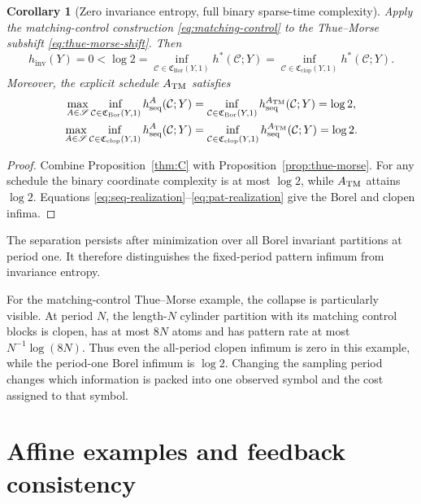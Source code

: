 \documentclass[11pt,reqno]{amsart}
\numberwithin{equation}{section}
\newtheorem{corollary}[theorem]{Corollary}
\theoremstyle{definition}
\theoremstyle{definition}
\newcommand{\C}{\mathcal C}
\newcommand{\hseq}{h_{\mathrm{seq}}}
\newcommand{\hpat}{h^{*}}
\newcommand{\hinv}{h_{\mathrm{inv}}}
\newcommand{\Bor}{\mathrm{Bor}}
\newcommand{\clop}{\mathrm{clop}}
\begin{document}
\begin{corollary}[Zero invariance entropy, full binary sparse-time complexity]
\label{cor:separation}
Apply the matching-control construction \eqref{eq:matching-control} to the
Thue--Morse subshift \eqref{eq:thue-morse-shift}.  Then
\begin{equation}\label{eq:strict-control-separation}
 \hinv(Y)=0
 <\log2
 =\inf_{\C\in\mathfrak C_{\Bor}(Y,1)}\hpat(\C;Y)
 =\inf_{\C\in\mathfrak C_{\clop}(Y,1)}\hpat(\C;Y).
\end{equation}
Moreover, the explicit schedule $A_{\rm TM}$ satisfies
\begin{align}
 \max_{A\in\mathscr S}\inf_{\C\in\mathfrak C_{\Bor}(Y,1)}
 \hseq^A(\C;Y)
 &=\inf_{\C\in\mathfrak C_{\Bor}(Y,1)}\hseq^{A_{\rm TM}}(\C;Y)
 =\log2,
 \label{eq:TM-Borel-sequence}\\
 \max_{A\in\mathscr S}\inf_{\C\in\mathfrak C_{\clop}(Y,1)}
 \hseq^A(\C;Y)
 &=\inf_{\C\in\mathfrak C_{\clop}(Y,1)}\hseq^{A_{\rm TM}}(\C;Y)
 =\log2.
 \label{eq:TM-clopen-sequence}
\end{align}
\end{corollary}

\begin{proof}
Combine Proposition~\ref{thm:C} with Proposition~\ref{prop:thue-morse}.  For any
schedule the binary coordinate complexity is at most $\log2$, while
$A_{\rm TM}$ attains $\log2$.  Equations
\eqref{eq:seq-realization}--\eqref{eq:pat-realization} give the Borel and
clopen infima.
\end{proof}

The separation persists after minimization over all Borel invariant
partitions at period one. It therefore distinguishes the fixed-period
pattern infimum from invariance entropy.


For the matching-control Thue--Morse example, the collapse is particularly
visible. At period $N$, the length-$N$ cylinder partition with its matching
control blocks is clopen, has at most $8N$ atoms and has pattern rate at
most $N^{-1}\log(8N)$. Thus even the all-period clopen infimum is zero
in this example, while the period-one Borel infimum is $\log2$.
Changing the sampling period changes which information is packed into
one observed symbol and the cost assigned to that symbol.

\section{Affine examples and feedback consistency}\label{sec:affine}
\end{document}
